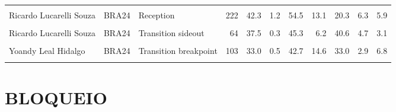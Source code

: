 \documentclass[
]{book}
\begin{document}
\begin{table}[!h]
{\begin{tabular}[t]{lllrrrrrrrr}
\cellcolor{gray!10}{Otavio Henrique Rodrigues Pinto} & \cellcolor{gray!10}{BRA24} & \cellcolor{gray!10}{Transition sideout} & \cellcolor{gray!10}{1} & \cellcolor{gray!10}{100.0} & \cellcolor{gray!10}{0.0} & \cellcolor{gray!10}{100.0} & \cellcolor{gray!10}{0.0} & \cellcolor{gray!10}{0.0} & \cellcolor{gray!10}{0.0} & \cellcolor{gray!10}{0.0}\\
Ricardo Lucarelli Souza & BRA24 & Reception & 222 & 42.3 & 1.2 & 54.5 & 13.1 & 20.3 & 6.3 & 5.9\\
\cellcolor{gray!10}{Ricardo Lucarelli Souza} & \cellcolor{gray!10}{BRA24} & \cellcolor{gray!10}{Transition breakpoint} & \cellcolor{gray!10}{128} & \cellcolor{gray!10}{30.5} & \cellcolor{gray!10}{0.6} & \cellcolor{gray!10}{46.1} & \cellcolor{gray!10}{17.2} & \cellcolor{gray!10}{21.1} & \cellcolor{gray!10}{8.6} & \cellcolor{gray!10}{7.0}\\
\addlinespace
Ricardo Lucarelli Souza & BRA24 & Transition sideout & 64 & 37.5 & 0.3 & 45.3 & 6.2 & 40.6 & 4.7 & 3.1\\
\cellcolor{gray!10}{Yoandy Leal Hidalgo} & \cellcolor{gray!10}{BRA24} & \cellcolor{gray!10}{Reception} & \cellcolor{gray!10}{197} & \cellcolor{gray!10}{39.6} & \cellcolor{gray!10}{1.1} & \cellcolor{gray!10}{54.3} & \cellcolor{gray!10}{9.6} & \cellcolor{gray!10}{21.3} & \cellcolor{gray!10}{8.1} & \cellcolor{gray!10}{6.6}\\
Yoandy Leal Hidalgo & BRA24 & Transition breakpoint & 103 & 33.0 & 0.5 & 42.7 & 14.6 & 33.0 & 2.9 & 6.8\\
\cellcolor{gray!10}{Yoandy Leal Hidalgo} & \cellcolor{gray!10}{BRA24} & \cellcolor{gray!10}{Transition sideout} & \cellcolor{gray!10}{47} & \cellcolor{gray!10}{29.8} & \cellcolor{gray!10}{0.2} & \cellcolor{gray!10}{48.9} & \cellcolor{gray!10}{12.8} & \cellcolor{gray!10}{19.1} & \cellcolor{gray!10}{17.0} & \cellcolor{gray!10}{2.1}\\
\bottomrule
\end{tabular}}
\end{table}

\chapter{BLOQUEIO}\label{bloqueio}

\begin{table}[!h]
\centering
{}
\end{table}
\end{document}
